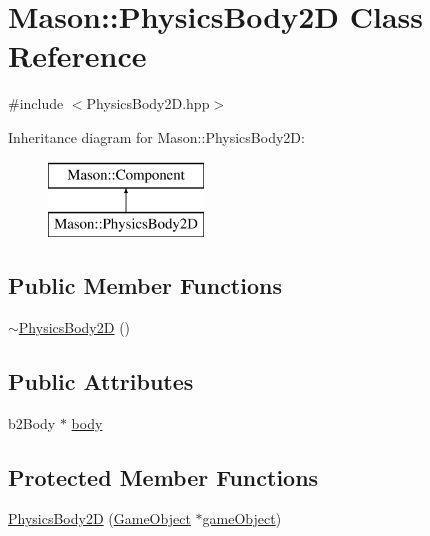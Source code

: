 \hypertarget{class_mason_1_1_physics_body2_d}{}\section{Mason\+:\+:Physics\+Body2D Class Reference}
\label{class_mason_1_1_physics_body2_d}


{\ttfamily \#include $<$Physics\+Body2\+D.\+hpp$>$}

Inheritance diagram for Mason\+:\+:Physics\+Body2D\+:\begin{figure}[H]
\begin{center}
\leavevmode
\includegraphics[height=2.000000cm]{class_mason_1_1_physics_body2_d}
\end{center}
\end{figure}
\subsection*{Public Member Functions}
\begin{DoxyCompactItemize}
\item 
\hyperlink{class_mason_1_1_physics_body2_d_a9cd23100f41c0ae3dbce853e88f804e1}{$\sim$\+Physics\+Body2D} ()
\end{DoxyCompactItemize}
\subsection*{Public Attributes}
\begin{DoxyCompactItemize}
\item 
b2\+Body $\ast$ \hyperlink{class_mason_1_1_physics_body2_d_abd02e269a86d5b760966a33eefa918d9}{body}
\end{DoxyCompactItemize}
\subsection*{Protected Member Functions}
\begin{DoxyCompactItemize}
\item 
\hyperlink{class_mason_1_1_physics_body2_d_a4b6b50a1b3945ab0669bcdc0748b3d1c}{Physics\+Body2D} (\hyperlink{class_mason_1_1_game_object}{Game\+Object} $\ast$\hyperlink{class_mason_1_1_component_a30030370c35f5562cbbbb0927b0448c8}{game\+Object})
\end{DoxyCompactItemize}

